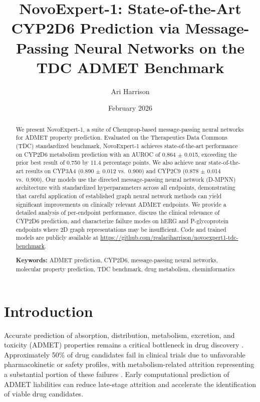 \documentclass[11pt]{article}
\title{NovoExpert-1: State-of-the-Art CYP2D6 Prediction via Message-Passing Neural Networks on the TDC ADMET Benchmark}
\author[1]{Ari Harrison}
\affil[1]{NovoQuant Nexus, San Francisco, CA, USA}
\date{February 2026}
\begin{document}
\maketitle

\begin{abstract}
We present NovoExpert-1, a suite of Chemprop-based message-passing neural networks for ADMET property prediction. Evaluated on the Therapeutics Data Commons (TDC) standardized benchmark, NovoExpert-1 achieves state-of-the-art performance on CYP2D6 metabolism prediction with an AUROC of 0.864 $\pm$ 0.015, exceeding the prior best result of 0.750 by 11.4 percentage points. We also achieve near state-of-the-art results on CYP3A4 (0.890 $\pm$ 0.012 vs.\ 0.900) and CYP2C9 (0.878 $\pm$ 0.014 vs.\ 0.900). Our models use the directed message-passing neural network (D-MPNN) architecture with standardized hyperparameters across all endpoints, demonstrating that careful application of established graph neural network methods can yield significant improvements on clinically relevant ADMET endpoints. We provide a detailed analysis of per-endpoint performance, discuss the clinical relevance of CYP2D6 prediction, and characterize failure modes on hERG and P-glycoprotein endpoints where 2D graph representations may be insufficient. Code and trained models are publicly available at \url{https://github.com/realariharrison/novoexpert1-tdc-benchmark}.

\medskip
\noindent\textbf{Keywords:} ADMET prediction, CYP2D6, message-passing neural networks, molecular property prediction, TDC benchmark, drug metabolism, cheminformatics
\end{abstract}

\section{Introduction}

Accurate prediction of absorption, distribution, metabolism, excretion, and toxicity (ADMET) properties remains a critical bottleneck in drug discovery \citep{kola2004can}. Approximately 50\% of drug candidates fail in clinical trials due to unfavorable pharmacokinetic or safety profiles, with metabolism-related attrition representing a substantial portion of these failures \citep{ferreira2019admet}. Early computational prediction of ADMET liabilities can reduce late-stage attrition and accelerate the identification of viable drug candidates.
\end{document}

